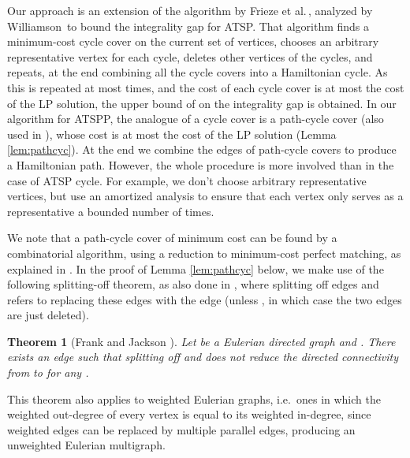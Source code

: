 \documentclass[11pt]{article}
\newtheorem{theorem}{Theorem}[section]
\begin{document}
Our approach is an extension of the algorithm by Frieze et al.\,\cite{frieze:galbiati}, analyzed by Williamson\,\cite{williamson:msthesis} to bound the integrality gap for ATSP. That algorithm finds a minimum-cost cycle cover on the current set of vertices, chooses an arbitrary representative vertex for each cycle, deletes other vertices of the cycles, and repeats, at the end combining all the cycle covers into a Hamiltonian cycle. As this is repeated at most  times, and the cost of each cycle cover is at most the cost of the LP solution, the upper bound of  on the integrality gap is obtained.  In our algorithm for ATSPP, the analogue of a cycle cover is a path-cycle cover (also used in \cite{lam:newman}), whose cost is at most the cost of the LP solution (Lemma \ref{lem:pathcyc}). At the end we combine the edges of  path-cycle covers to produce a Hamiltonian path. However, the whole procedure is more involved than in the case of ATSP cycle. For example, we don't choose arbitrary representative vertices, but use an amortized analysis to ensure that each vertex only serves as a representative a bounded number of times.

We note that a path-cycle cover of minimum cost can be found by a combinatorial algorithm, using a reduction to minimum-cost perfect matching, as explained in \cite{lam:newman}.  
In the proof of Lemma \ref{lem:pathcyc} below, we make use of the following splitting-off theorem, as also done in \cite{nagarajan:ravi:polylog}, where splitting off edges  and  refers to replacing these edges with the edge  (unless , in which case the two edges are just deleted). 

\begin{theorem}[Frank \cite{frank} and Jackson \cite{jackson}] \label{thm:so}
Let  be a Eulerian directed graph and . There exists an edge  such that splitting off  and  
does not reduce the directed connectivity from  to  for any .
\end{theorem}
This theorem also applies to weighted Eulerian graphs, i.e.\ ones in which the weighted out-degree of every vertex is equal to its weighted in-degree, since weighted edges can be replaced by multiple parallel edges, producing an unweighted Eulerian multigraph.
\end{document}
